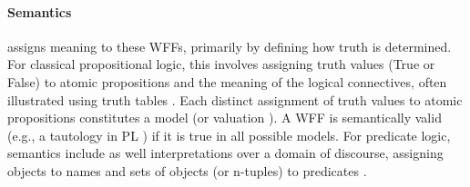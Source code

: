 \paragraph{Semantics} assigns meaning to these WFFs, primarily by defining how truth is determined. For classical propositional logic, this involves assigning truth values (True or False) to atomic propositions and the meaning of the logical connectives, often illustrated using truth tables \cite[Sec.~3.1-3.2]{Agler2013SymbolicLogic}. Each distinct assignment of truth values to atomic propositions constitutes a model (or valuation \cite[Sec.~3.1]{Agler2013SymbolicLogic}). A WFF is semantically valid (e.g., a tautology in PL \cite[Sec.~3.3.1]{Agler2013SymbolicLogic}) if it is true in all possible models. For predicate logic, semantics include as well interpretations over a domain of discourse, assigning objects to names and sets of objects (or n-tuples) to predicates \cite[Ch.~6.4]{Agler2013SymbolicLogic}.

